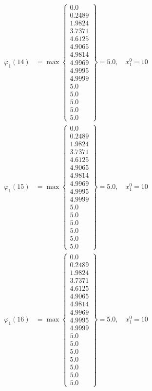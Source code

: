 \documentclass{article}
\begin{document}
\begin{align*}
\varphi_{1}(14) &= \max \left\{ \begin{array}{c}
0.0 \\
 0.2489 \\
 1.9824 \\
 3.7371 \\
 4.6125 \\
 4.9065 \\
 4.9814 \\
 4.9969 \\
 4.9995 \\
 4.9999 \\
 5.0 \\
 5.0 \\
 5.0 \\
 5.0 \\
 5.0
\end{array} \right\}=5.0, \quad x_{1}^0=10\\
  
\varphi_{1}(15) &= \max \left\{ \begin{array}{c}
0.0 \\
 0.2489 \\
 1.9824 \\
 3.7371 \\
 4.6125 \\
 4.9065 \\
 4.9814 \\
 4.9969 \\
 4.9995 \\
 4.9999 \\
 5.0 \\
 5.0 \\
 5.0 \\
 5.0 \\
 5.0 \\
 5.0
\end{array} \right\}=5.0, \quad x_{1}^0=10\\
  
\varphi_{1}(16) &= \max \left\{ \begin{array}{c}
0.0 \\
 0.2489 \\
 1.9824 \\
 3.7371 \\
 4.6125 \\
 4.9065 \\
 4.9814 \\
 4.9969 \\
 4.9995 \\
 4.9999 \\
 5.0 \\
 5.0 \\
 5.0 \\
 5.0 \\
 5.0 \\
 5.0 \\
 5.0
\end{array} \right\}=5.0, \quad x_{1}^0=10\\
  

\end{align*}
\end{document}
